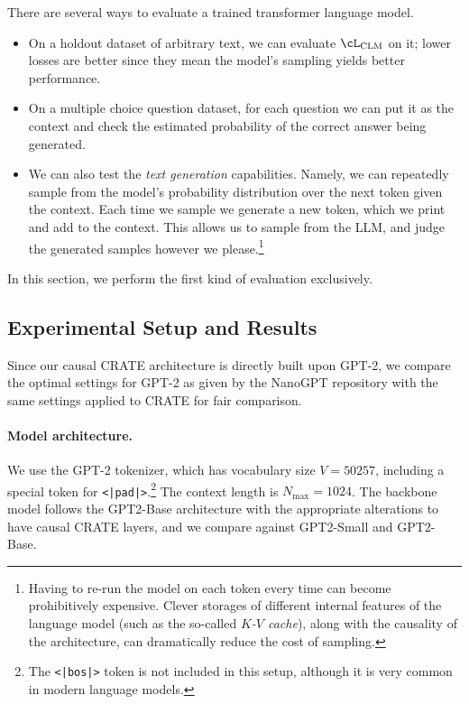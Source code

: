 \documentclass[../../book-main.tex]{subfiles}
\begin{document}
There are several ways to evaluate a trained transformer language model.
\begin{itemize}
    \item On a holdout dataset of arbitrary text, we can evaluate \(\cL_{\mathrm{CLM}}\) on it; lower losses are better since they mean the model's sampling yields better performance.
    \item On a multiple choice question dataset, for each question we can put it as the context and check the estimated probability of the correct answer being generated.
    \item We can also test the \textit{text generation} capabilities. Namely, we can repeatedly sample from the model's probability distribution over the next token given the context. Each time we sample we generate a new token, which we print and add to the context. This allows us to sample from the LLM, and judge the generated samples however we please.\footnote{Having to re-run the model on each token every time can become prohibitively expensive. Clever storages of different internal features of the language model (such as the so-called \textit{\(K\)-\(V\) cache}), along with the causality of the architecture, can dramatically reduce the cost of sampling.}
\end{itemize}
In this section, we perform the first kind of evaluation exclusively.

\subsection{Experimental Setup and Results}

Since our causal CRATE architecture is directly built upon GPT-2, we compare the optimal settings for GPT-2 as given by the NanoGPT repository \citep{nanogpt} with the same settings applied to CRATE for fair comparison.

\paragraph{Model architecture.} We use the GPT-2 tokenizer, which has vocabulary size \(V = 50257\), including a special token for \texttt{<|pad|>}.\footnote{The \texttt{<|bos|>} token is not included in this setup, although it is very common in modern language models.} The context length is \(N_{\max} = 1024\). The backbone model follows the GPT2-Base architecture \citep{radford2019language} with the appropriate alterations to have causal CRATE layers, and we compare against GPT2-Small and GPT2-Base.
\end{document}
